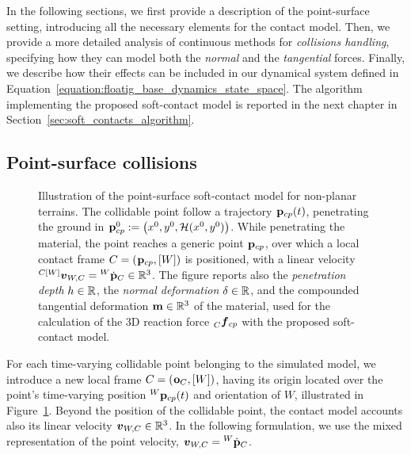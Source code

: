 In the following sections, we first provide a description of the point-surface setting, introducing all the necessary elements for the contact model.
Then, we provide a more detailed analysis of continuous methods for \emph{collisions handling}, specifying how they can model both the \emph{normal} and the \emph{tangential} forces.
Finally, we describe how their effects can be included in our dynamical system defined in Equation~\eqref{equation:floatig_base_dynamics_state_space}.
The algorithm implementing the proposed soft-contact model is reported in the next chapter in Section~\ref{sec:soft_contacts_algorithm}. 

\subsection{Point-surface collisions}
\label{section:point-surface_collisions}

\begin{figure}
    \centering
    \caption{Illustration of the point-surface soft-contact model for non-planar terrains. The collidable point follow a trajectory $\pos_{cp}(t)$, penetrating the ground in $\pos_{cp}^0 := \left( x^0, y^0, \mathcal{H}(x^0, y^0) \right)$. While penetrating the material, the point reaches a generic point $\pos_{cp}$, over which a local contact frame $C = (\pos_{cp}, [W])$ is positioned, with a linear velocity $\vellin[{C[W]}]_{W,C} = \posd[W]_C \in \realn^3$. The figure reports also the \emph{penetration depth} $h \in \realn$, the \emph{normal deformation} $\delta \in \realn$, and the compounded tangential deformation $\mathbf{m} \in \realn^3$ of the material, used for the calculation of the 3D reaction force $\forcelin[C]_{cp}$ with the proposed soft-contact model.}
    \label{fig:soft_contact_model}
\end{figure}

For each time-varying collidable point belonging to the simulated model, we introduce a new local frame $C = (\ori_C, [W])$, having its origin located over the point's time-varying position $\pos[W]_{cp}(t)$ and orientation of $W$, illustrated in Figure~\ref{fig:soft_contact_model}.
Beyond the position of the collidable point, the contact model accounts also its linear velocity $\vellin_{W,C} \in \realn^3$.
In the following formulation, we use the mixed representation of the point velocity, \ie $\vellin_{W,C} = \posd[W]_C$.

